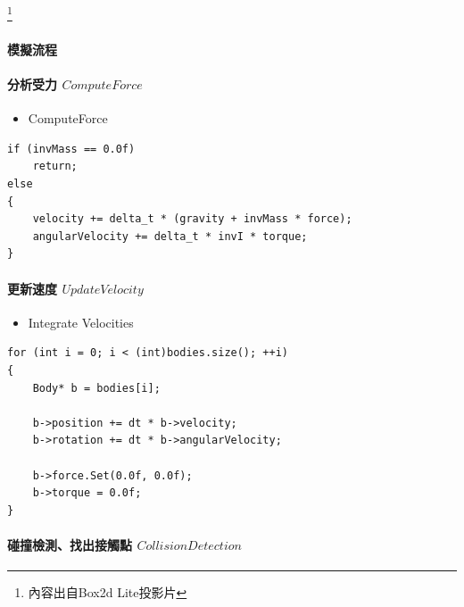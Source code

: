 \footnote{內容出自Box2d Lite投影片}   

\paragraph{模擬流程}
\paragraph{分析受力 \(Compute Force\)}

\begin{itemize}
    \item{ComputeForce}
\end{itemize}

\begin{lstlisting}
if (invMass == 0.0f)
    return;
else
{
    velocity += delta_t * (gravity + invMass * force);
    angularVelocity += delta_t * invI * torque;
}
\end{lstlisting}


\paragraph{更新速度 \(Update Velocity\)}

\begin{itemize}
    \item{Integrate Velocities}
\end{itemize}

\begin{lstlisting}
for (int i = 0; i < (int)bodies.size(); ++i)
{
    Body* b = bodies[i];

    b->position += dt * b->velocity;
    b->rotation += dt * b->angularVelocity;

    b->force.Set(0.0f, 0.0f);
    b->torque = 0.0f;
}
\end{lstlisting}

\paragraph{碰撞檢測、找出接觸點 \(Collision Detection\)}

